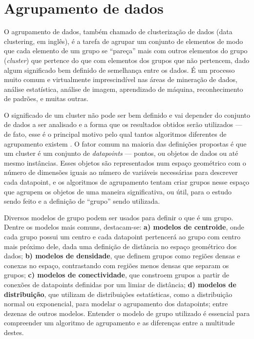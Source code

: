 \documentclass[12pt,
openright, 
oneside, %
a4paper,    %
brazil]{facom-ufu-abntex2}
\begin{document}




\section{Agrupamento de dados}

O agrupamento de dados, também chamado de clusterização de dados (data clustering, em inglês), é a tarefa de agrupar um conjunto de elementos de modo que cada elemento de um grupo se \enquote{pareça} mais com outros elementos do grupo (\textit{cluster}) que pertence do que com elementos dos grupos que não pertencem, dado algum significado bem definido de semelhança entre os dados. É um processo muito comum e virtualmente imprescindível nas áreas de mineração de dados, análise estatística, análise de imagem, aprendizado de máquina, reconhecimento de padrões, e muitas outras.

O significado de um cluster não pode ser bem definido e vai depender do conjunto de dados a ser analisado e a forma que os resultados obtidos serão utilizados --- de fato, esse é o principal motivo pelo qual tantos algoritmos diferentes de agrupamento existem \cite{SoManyClustAlg}. O fator comum na maioria das definições propostas é que um cluster é um conjunto de \textit{datapoints} --- pontos, ou objetos de dados ou até mesmo instâncias. Esses objetos são representados num espaço geométrico com o número de dimensões iguais ao número de variáveis necessárias para descrever cada datapoint, e os algoritmos de agrupamento tentam criar grupos nesse espaço que agrupem os objetos de uma maneira significativa, ou útil, para o estudo sendo feito e a definição de \enquote{grupo} sendo utilizada.


Diversos modelos de grupo podem ser usados para definir o que é um grupo. Dentre os modelos mais comuns, destacam-se: \textbf{a) modelos de centroide}, onde cada grupo possui um centro e cada datapoint pertencerá ao grupo com centro mais próximo dele, dada uma definição de distância no espaço geométrico dos dados; \textbf{b) modelos de densidade}, que definem grupos como regiões densas e conexas no espaço, contrastando com regiões menos densas que separam os grupos; \textbf{c) modelos de conectividade}, que constroem grupos a partir de conexões de datapoints definidas por um limiar de distância; \textbf{d) modelos de distribuição}, que utilizam de distribuições estatísticas, como a distribuição normal ou exponencial, para modelar o agrupamento dos datapoints; entre dezenas de outros modelos. Entender o modelo de grupo utilizado é essencial para compreender um algoritmo de agrupamento e as diferenças entre a multitude destes.
\end{document}
